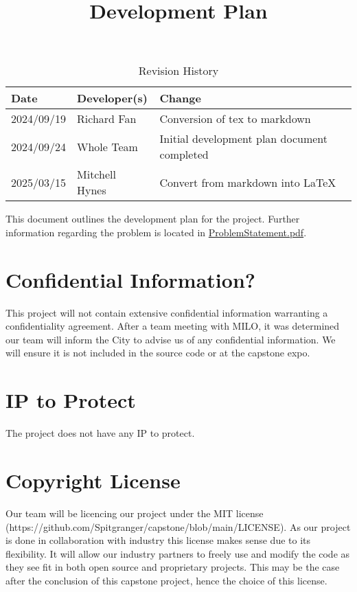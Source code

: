 \documentclass{article}
\title{Development Plan\\\progname}
\author{\authname}
\date{}
\begin{document}
\maketitle

\begin{table}[hp]
  \caption{Revision History} \label{TblRevisionHistory}
  \begin{tabularx}{\textwidth}{llX}
    \toprule
    \textbf{Date} & \textbf{Developer(s)} & \textbf{Change}\\
    \midrule
    2024/09/19 & Richard Fan & Conversion of tex to markdown\\
    2024/09/24 & Whole Team & Initial development plan document completed\\
    2025/03/15 & Mitchell Hynes & Convert from markdown into \LaTeX \\
    \bottomrule
  \end{tabularx}
\end{table}

\newpage{}

This document outlines the development plan for the project. Further information regarding the problem is
located in
\href{https://github.com/Spitgranger/SyncMaster/blob/main/docs/ProblemStatementAndGoals/ProblemStatement.pdf}{ProblemStatement.pdf}.

\section{Confidential Information?}

This project will not contain extensive confidential information warranting a confidentiality agreement. After a
team meeting with MILO, it was determined our team will inform the City to advise us of any confidential
information. We will ensure it is not included in the source code or at the capstone expo.

\section{IP to Protect}

The project does not have any IP to protect.

\section{Copyright License}

Our team will be licencing our project under the MIT license\\
(https://github.com/Spitgranger/capstone/blob/main/LICENSE). 
As our project is done in collaboration with
industry this license makes sense due to its flexibility. It will allow our industry partners to freely use and
modify the code as they see fit in both open source and proprietary projects. This may be the case after the
conclusion of this capstone project, hence the choice of this license.
\end{document}
